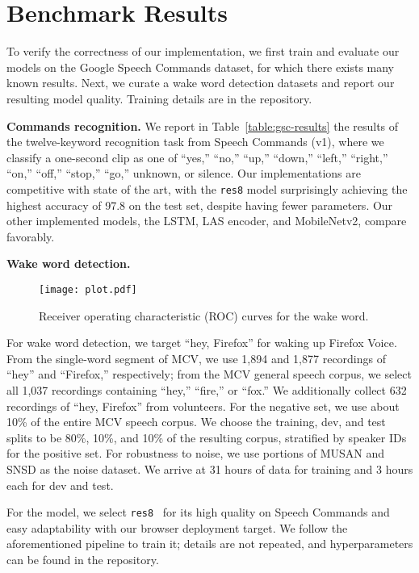 \documentclass[11pt,a4paper]{article}
\newcommand{\parheader}[1]{{\smallskip \noindent \bf #1.}}
\begin{document}
\section{Benchmark Results}
To verify the correctness of our implementation, we first train and evaluate our models on the Google Speech Commands dataset, for which there exists many known results.
Next, we curate a wake word detection datasets and report our resulting model quality.
Training details are in the repository.

\parheader{Commands recognition}
We report in Table~\ref{table:gsc-results} the results of the twelve-keyword recognition task from Speech Commands (v1), where we classify a one-second clip as one of ``yes,'' ``no,'' ``up,'' ``down,'' ``left,'' ``right,'' ``on,'' ``off,'' ``stop,'' ``go,'' unknown, or silence.
Our implementations are competitive with state of the art, with the \texttt{res8} model surprisingly achieving the highest accuracy of 97.8 on the test set, despite having fewer parameters.
Our other implemented models, the LSTM, LAS encoder, and MobileNetv2, compare favorably.

\parheader{Wake word detection}
\begin{figure}
    \centering
    \texttt{[image: plot.pdf]}
    \caption{Receiver operating characteristic (ROC) curves for the wake word.}
    \label{fig:result-heyff}
\end{figure}
For wake word detection, we target ``hey, Firefox'' for waking up Firefox Voice.
From the single-word segment of MCV, we use 1,894 and 1,877 recordings of ``hey'' and ``Firefox,'' respectively; from the MCV general speech corpus, we select all 1,037 recordings containing ``hey,'' ``fire,'' or ``fox.''
We additionally collect 632 recordings of ``hey, Firefox'' from volunteers.
For the negative set, we use about 10\% of the entire MCV speech corpus.
We choose the training, dev, and test splits to be 80\%, 10\%, and 10\% of the resulting corpus, stratified by speaker IDs for the positive set.
For robustness to noise, we use portions of MUSAN and SNSD as the noise dataset.
We arrive at 31 hours of data for training and 3 hours each for dev and test.

For the model, we select \texttt{res8}~\cite{tang2018deep} for its high quality on Speech Commands and easy adaptability with our browser deployment target.
We follow the aforementioned pipeline to train it; details are not repeated, and hyperparameters can be found in the repository.
\end{document}
